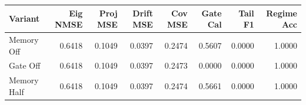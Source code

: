 \begin{tabular}{lrrrrrrr}
\toprule
Variant & Eig NMSE & Proj MSE & Drift MSE & Cov MSE & Gate Cal & Tail F1 & Regime Acc \\
\midrule
Memory Off & 0.6418 & 0.1049 & 0.0397 & 0.2474 & 0.5607 & 0.0000 & 1.0000 \\
Gate Off & 0.6418 & 0.1049 & 0.0397 & 0.2473 & 0.0000 & 0.0000 & 1.0000 \\
Memory Half & 0.6418 & 0.1049 & 0.0397 & 0.2474 & 0.5661 & 0.0000 & 1.0000 \\
\bottomrule
\end{tabular}